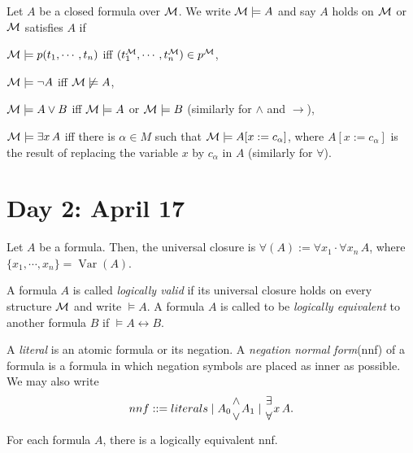 \documentclass{../../../small}
\DeclareMathOperator{\Var}{Var}
\begin{document}
\begin{defn}
Let $A$ be a closed formula over $\mathcal{M}$.
We write $\mathcal{M}\models A$ and say $A$ holds on $\mathcal{M}$ or $\mathcal{M}$ satisfies $A$ if
\begin{parts}
\item $\mathcal{M}\models p(t_1,\cdots,t_n)$ iff $(t_1^{\mathcal{M}},\cdots,t_n^{\mathcal{M}})\in p^{\mathcal{M}}$,
\item $\mathcal{M}\models\neg A$ iff $\mathcal{M}\not\models A$,
\item $\mathcal{M}\models A\vee B$ iff $\mathcal{M}\models A$ or $\mathcal{M}\models B$ (similarly for $\wedge$ and $\to$),
\item $\mathcal{M}\models\exists x\,A$ iff there is $\alpha\in M$ such that $\mathcal{M}\models A[x:=c_\alpha]$, where $A[x:=c_\alpha]$ is the result of replacing the variable $x$ by $c_\alpha$ in $A$ (similarly for $\forall$).
\end{parts}
\end{defn}



\iffalse
First order syntax

variables
	functions
terms
	a relation
literals
	connectives
formulas
	quantifiers
sentences
\fi



\section{Day 2: April 17}

Let $A$ be a formula.
Then, the universal closure is $\forall(A):=\forall x_1\cdot\forall x_n\,A$, where $\{x_1,\cdots,x_n\}=\Var(A)$.

\begin{defn*}
A formula $A$ is called \emph{logically valid} if its universal closure holds on every structure $\mathcal{M}$ and write $\models A$.
A formula $A$ is called to be \emph{logically equivalent} to another formula $B$ if $\models A\leftrightarrow B$.
\end{defn*}

\begin{defn*}
A \emph{literal} is an atomic formula or its negation.
A \emph{negation normal form}(nnf) of a formula is a formula in which negation symbols are placed as inner as possible.
We may also write
\[nnf::=literals\mid A_0{\wedge\atop\vee}A_1\mid{\exists\atop\forall}x\,A.\]
\end{defn*}

\begin{prop*}
For each formula $A$, there is a logically equivalent nnf.
\end{prop*}
\end{document}
